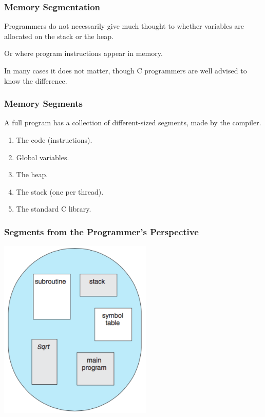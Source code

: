 \begin{frame}
\frametitle{Memory Segmentation}

Programmers do not necessarily give much thought to whether variables are allocated on the stack or the heap.

Or where program instructions appear in memory. 

In many cases it does not matter, though C programmers are well advised to know the difference.


\end{frame}

\begin{frame}
\frametitle{Memory Segments}

A full program has a collection of different-sized segments, made by the compiler.

\begin{enumerate}
	\item The code (instructions).
	\item Global variables.
	\item The heap.
	\item The stack (one per thread).
	\item The standard C library.
\end{enumerate}

\end{frame}

\begin{frame}
\frametitle{Segments from the Programmer's Perspective}

\begin{center}
\includegraphics[width=0.55\textwidth]{images/segments.png}
\end{center}


\end{frame}


